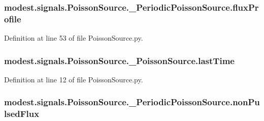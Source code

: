 \subsubsection[{\texorpdfstring{flux\+Profile}{fluxProfile}}]{\setlength{\rightskip}{0pt plus 5cm}modest.\+signals.\+Poisson\+Source.\+\_\+\+Periodic\+Poisson\+Source.\+flux\+Profile}\hypertarget{classmodest_1_1signals_1_1PoissonSource_1_1__PeriodicPoissonSource_a685524f0f5a4a11ef3aefaa5916285de}{}\label{classmodest_1_1signals_1_1PoissonSource_1_1__PeriodicPoissonSource_a685524f0f5a4a11ef3aefaa5916285de}


Definition at line 53 of file Poisson\+Source.\+py.

\subsubsection[{\texorpdfstring{last\+Time}{lastTime}}]{\setlength{\rightskip}{0pt plus 5cm}modest.\+signals.\+Poisson\+Source.\+\_\+\+Poisson\+Source.\+last\+Time\hspace{0.3cm}{\ttfamily [inherited]}}\hypertarget{classmodest_1_1signals_1_1PoissonSource_1_1__PoissonSource_a96ba5dd0643792be6fbf7af966515a01}{}\label{classmodest_1_1signals_1_1PoissonSource_1_1__PoissonSource_a96ba5dd0643792be6fbf7af966515a01}


Definition at line 12 of file Poisson\+Source.\+py.

\subsubsection[{\texorpdfstring{non\+Pulsed\+Flux}{nonPulsedFlux}}]{\setlength{\rightskip}{0pt plus 5cm}modest.\+signals.\+Poisson\+Source.\+\_\+\+Periodic\+Poisson\+Source.\+non\+Pulsed\+Flux}\hypertarget{classmodest_1_1signals_1_1PoissonSource_1_1__PeriodicPoissonSource_af6dcdf16e85360c87b6efecaf53b653c}{}\label{classmodest_1_1signals_1_1PoissonSource_1_1__PeriodicPoissonSource_af6dcdf16e85360c87b6efecaf53b653c}


